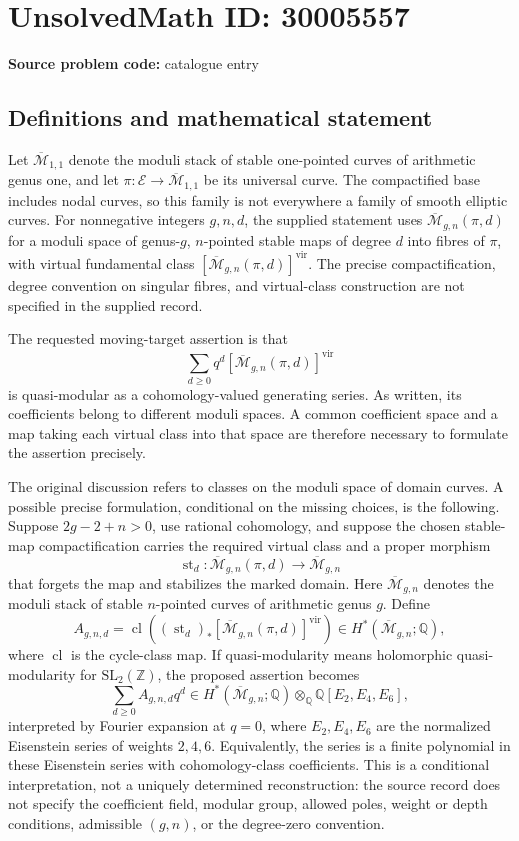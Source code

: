 \documentclass[11pt]{article}
\newcommand{\Z}{\mathbb{Z}}
\newcommand{\Q}{\mathbb{Q}}
\begin{document}
\section*{UnsolvedMath ID: 30005557}
\textbf{Source problem code:} catalogue entry
\subsection{Definitions and mathematical statement}
Let \(\overline{\mathcal M}_{1,1}\) denote the moduli stack of stable one-pointed curves of arithmetic genus one, and let \(\pi:\mathcal E\to\overline{\mathcal M}_{1,1}\) be its universal curve. The compactified base includes nodal curves, so this family is not everywhere a family of smooth elliptic curves. For nonnegative integers \(g,n,d\), the supplied statement uses \(\overline{\mathcal M}_{g,n}(\pi,d)\) for a moduli space of genus-\(g\), \(n\)-pointed stable maps of degree \(d\) into fibres of \(\pi\), with virtual fundamental class \([\overline{\mathcal M}_{g,n}(\pi,d)]^{\mathrm{vir}}\). The precise compactification, degree convention on singular fibres, and virtual-class construction are not specified in the supplied record.

The requested moving-target assertion is that
\[
\sum_{d\geq 0}q^d[\overline{\mathcal M}_{g,n}(\pi,d)]^{\mathrm{vir}}
\]
is quasi-modular as a cohomology-valued generating series. As written, its coefficients belong to different moduli spaces. A common coefficient space and a map taking each virtual class into that space are therefore necessary to formulate the assertion precisely.

The original discussion refers to classes on the moduli space of domain curves. A possible precise formulation, conditional on the missing choices, is the following. Suppose \(2g-2+n>0\), use rational cohomology, and suppose the chosen stable-map compactification carries the required virtual class and a proper morphism
\[
\operatorname{st}_d:\overline{\mathcal M}_{g,n}(\pi,d)\longrightarrow\overline{\mathcal M}_{g,n}
\]
that forgets the map and stabilizes the marked domain. Here \(\overline{\mathcal M}_{g,n}\) denotes the moduli stack of stable \(n\)-pointed curves of arithmetic genus \(g\). Define
\[
A_{g,n,d}=\operatorname{cl}\!\left((\operatorname{st}_d)_*[\overline{\mathcal M}_{g,n}(\pi,d)]^{\mathrm{vir}}\right)
\in H^*(\overline{\mathcal M}_{g,n};\Q),
\]
where \(\operatorname{cl}\) is the cycle-class map. If quasi-modularity means holomorphic quasi-modularity for \(\mathrm{SL}_2(\Z)\), the proposed assertion becomes
\[
\sum_{d\geq0}A_{g,n,d}q^d
\in H^*(\overline{\mathcal M}_{g,n};\Q)\otimes_{\Q}\Q[E_2,E_4,E_6],
\]
interpreted by Fourier expansion at \(q=0\), where \(E_2,E_4,E_6\) are the normalized Eisenstein series of weights \(2,4,6\). Equivalently, the series is a finite polynomial in these Eisenstein series with cohomology-class coefficients. This is a conditional interpretation, not a uniquely determined reconstruction: the source record does not specify the coefficient field, modular group, allowed poles, weight or depth conditions, admissible \((g,n)\), or the degree-zero convention.
\end{document}

